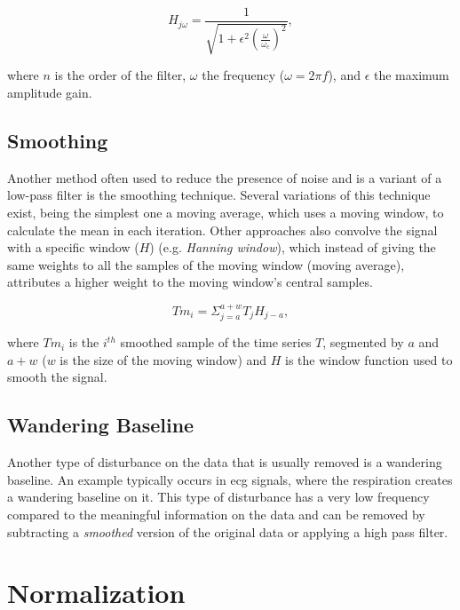 \begin{equation}
H_{j\omega} = \frac{1}{\sqrt{1+\epsilon^2 \left(\frac{\omega}{\omega_c}\right)^2}},
\end{equation}

where $n$ is the order of the filter, $\omega$ the frequency ($\omega=2\pi f$), and $\epsilon$ the maximum amplitude gain. 


\subsection{Smoothing}
\label{subsec:smooth}

Another method often used to reduce the presence of noise and is a variant of a low-pass filter is the smoothing technique. Several variations of this technique exist, being the simplest one a moving average, which uses a moving window, to calculate the mean in each iteration. Other approaches also convolve the signal with a specific window ($H$) (e.g. \textit{Hanning window}), which instead of giving the same weights to all the samples of the moving window (moving average), attributes a higher weight to the moving window's central samples.
 
\begin{equation}
Tm_i = \Sigma_{j=a}^{a+w} T_jH_{j-a},
\end{equation}

where $Tm_i$ is the $i^{th}$ smoothed sample of the time series $T$, segmented by $a$ and $a+w$ ($w$ is the size of the moving window) and $H$ is the window function used to smooth the signal.

\subsection{Wandering Baseline}
\label{subsec:w_baseline}

Another type of disturbance on the data that is usually removed is a wandering baseline. An example typically occurs in \gls{ecg} signals, where the respiration creates a wandering baseline on it. This type of disturbance has a very low frequency compared to the meaningful information on the data and can be removed by subtracting a \textit{smoothed} version of the original data or applying a high pass filter.

\section{Normalization} 
\label{sec:normalize}

